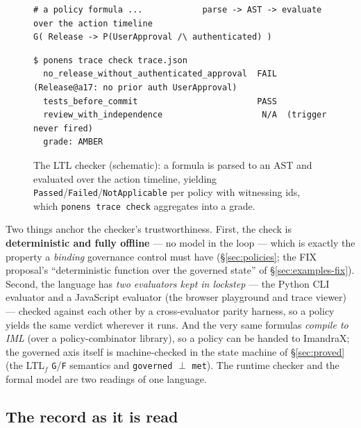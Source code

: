 \documentclass[11pt]{article}
\newcommand{\codeus}{\textunderscore\penalty100\relax}
\newcommand{\code}[1]{\texttt{\let\_\codeus #1}}
\begin{document}
\begin{figure}[H]
\begin{lstlisting}[language=Policy]
# a policy formula ...            parse -> AST -> evaluate over the action timeline
G( Release -> P(UserApproval /\ authenticated) )
\end{lstlisting}
\vspace{-6pt}
\begin{lstlisting}[language=PonensCLI]
$ ponens trace check trace.json
  no_release_without_authenticated_approval  FAIL  (Release@a17: no prior auth UserApproval)
  tests_before_commit                        PASS
  review_with_independence                    N/A  (trigger never fired)
  grade: AMBER
\end{lstlisting}
\caption{The LTL checker (schematic): a formula is parsed to an AST and evaluated over the action timeline,
yielding \code{Passed}/\code{Failed}/\code{NotApplicable} per policy with witnessing ids, which
\code{ponens trace check} aggregates into a grade.}
\label{fig:ltl-checker}
\end{figure}

Two things anchor the checker's trustworthiness. First, the check is \textbf{deterministic and fully
offline} --- no model in the loop --- which is exactly the property a \emph{binding} governance control must
have (\S\ref{sec:policies}; the FIX proposal's ``deterministic function over the governed state'' of
\S\ref{sec:examples-fix}). Second, the language has \emph{two evaluators kept in lockstep} --- the Python CLI
evaluator and a JavaScript evaluator (the browser playground and trace viewer) --- checked against each
other by a cross-evaluator parity harness, so a policy yields the same verdict wherever it runs. And the very
same formulas \emph{compile to IML} (over a policy-combinator library), so a policy can be handed to
ImandraX; the governed axis itself is machine-checked in the state machine of \S\ref{sec:proved} (the
\textrm{LTL}$_f$ \code{G}/\code{F} semantics and \code{governed} $\perp$ \code{met}). The runtime checker and
the formal model are two readings of one language.

\subsection{The record as it is read}\label{sec:impl-overview}
\end{document}
